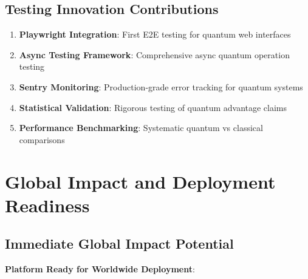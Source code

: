 \documentclass[12pt,a4paper]{article}
\begin{document}
\subsection{Testing Innovation Contributions}

\begin{enumerate}
    \item \textbf{Playwright Integration}: First E2E testing for quantum web interfaces
    \item \textbf{Async Testing Framework}: Comprehensive async quantum operation testing
    \item \textbf{Sentry Monitoring}: Production-grade error tracking for quantum systems
    \item \textbf{Statistical Validation}: Rigorous testing of quantum advantage claims
    \item \textbf{Performance Benchmarking}: Systematic quantum vs classical comparisons
\end{enumerate}

\section{Global Impact and Deployment Readiness}

\subsection{Immediate Global Impact Potential}

\textbf{Platform Ready for Worldwide Deployment}:
\end{document}
